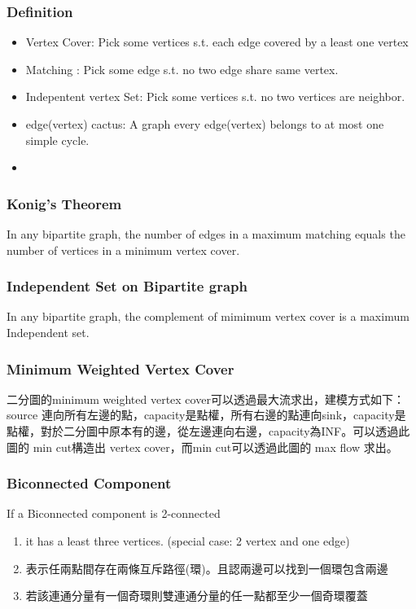 \subsubsection{Definition}
\begin{itemize}
	\setlength\itemsep{-0.5em}
	\item Vertex Cover: Pick some vertices s.t. each edge covered by a least one vertex
	\item Matching : Pick some edge s.t. no two edge share same vertex.
	\item Indepentent vertex Set: Pick some vertices s.t. no two vertices are neighbor.
	\item edge(vertex) cactus: A graph every edge(vertex) belongs to at most one simple cycle.
		\item 
\end{itemize}


\subsubsection{Konig's Theorem}

In any bipartite graph, the number of edges in a maximum matching equals the number of vertices in a minimum vertex cover.

\subsubsection{Independent Set on Bipartite graph}

In any bipartite graph, the complement of mimimum vertex cover is a maximum Independent set.

\subsubsection{Minimum Weighted Vertex Cover}

二分圖的minimum weighted vertex cover可以透過最大流求出，建模方式如下：source 連向所有左邊的點，capacity是點權，所有右邊的點連向sink，capacity是點權，對於二分圖中原本有的邊，從左邊連向右邊，capacity為INF。可以透過此圖的 min cut構造出 vertex cover，而min cut可以透過此圖的 max flow 求出。

\subsubsection{Biconnected Component}
If a Biconnected component is 2-connected
\begin{enumerate}
	\setlength\itemsep{-0.5em}
	\item it has a least three vertices. (special case: 2 vertex and one edge)
	\item 表示任兩點間存在兩條互斥路徑(環)。且認兩邊可以找到一個環包含兩邊
	\item 若該連通分量有一個奇環則雙連通分量的任一點都至少一個奇環覆蓋
\end{enumerate}
